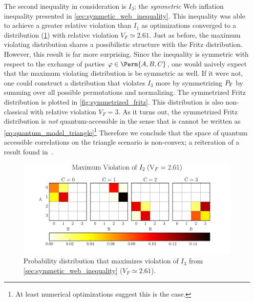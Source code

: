 \documentclass[aps, 10pt, english, twoside, pra, nofootinbib, tightenlines, longbibliography]{revtex4-1}
\begin{document}
    The second inequality in consideration is $I_3$; the \textit{symmetric} Web inflation inequality presented in \cref{sec:symmetic_web_inequality}. This inequality was able to achieve a greater relative violation than $I_1$ as optimizations converged to a distribution (\cref{fig:maximum_violation_I_3}) with relative violation $V_F \simeq 2.61$. Just as before, the maximum violating distribution shares a possibilistic structure with the Fritz distribution. However, this result is far more surprising. Since the inequality is symmetric with respect to the exchange of parties $\varphi \in \Perm{A, B, C}$, one would naively expect that the maximum violating distribution is be symmetric as well. If it were not, one could construct a distribution that violates $I_3$ more by symmetrizing $\prob[\fritz]$ by summing over all possible permutations and normalizing. The symmetrized Fritz distribution is plotted in \cref{fig:symmetrized_fritz}. This distribution is also non-classical with relative violation $V_F = 3$. As it turns out, the symmetrized Fritz distribution is \textit{not} quantum-accessible in the sense that is cannot be written as \cref{eq:quantum_model_triangle}\footnote{At least numerical optimizations suggest this is the case.} Therefore we conclude that the space of quantum accessible correlations on the triangle scenario is non-convex; a reiteration of a result found in~\citet{Inflation}.
    \begin{figure}
    \begin{center}
            \includegraphics[scale=0.6,trim={0 0 0 0.4in},clip]{../../figures/distributions/plotted_dist_I_3_max_violation_2017.pdf}
            \caption{Probability distribution that maximizes violation of $I_3$ from \cref{sec:symmetic_web_inequality} ($V_F \simeq 2.61$).}
            \label{fig:maximum_violation_I_3}
    \end{center}
    \end{figure}
\end{document}

